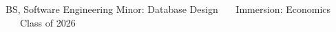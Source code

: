      {BS, Software Engineering}
     {Minor: Database Design \ \textbullet\ \ Immersion: Economics \ \textbullet\ \ Class of 2026}
